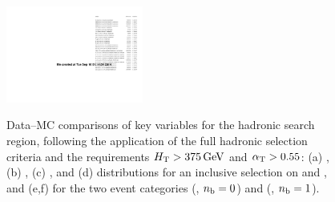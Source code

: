 \begin{figure}[h!]
{    \label{fig:figures_HT_0}
    \includegraphics[width=0.4\textwidth,page=123]{figures/data-mc/v21/had/hadronicLook_375_pfJet_ge2j.pdf}
  } 
   \\
  \caption{\label{fig:control-plots-sig} Data--MC comparisons of key
    variables for the hadronic search region, following the
    application of the full hadronic selection criteria and the
    requirements $\mbox{$H_\text{T}$} > 375\,\text{Ge\hspace{-.08em}V}$ and $\alpha_{\text{T}} > 0.55$: (a) \njet,
    (b) \nb, (c) \mht, and (d) \met distributions for an inclusive 
    selection on \njet and \nb, and (e,f) \scalht  for the two 
    event categories (\njetlow, $n_{\text{b}} = 0$) and (\njethigh, $n_{\text{b}} = 1$). }
\end{figure}

\FloatBarrier
